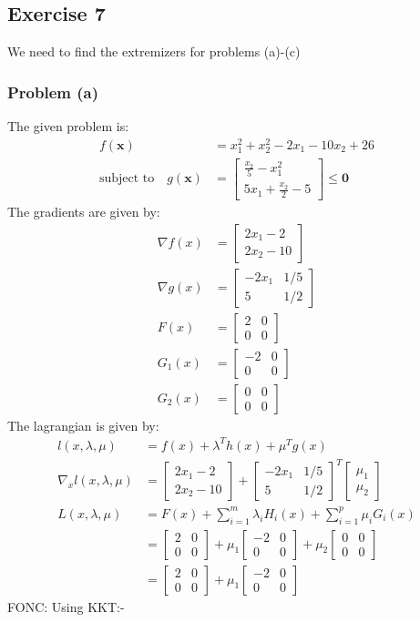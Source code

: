 \documentclass[a4paper,11pt]{article}
\newcommand{\V}[1]{\pmb{#1}}
\newcommand{\mat}[1]{\begin{bmatrix}#1\end{bmatrix}}
\begin{document}
\clearpage
\vspace{2ex}
\subsection*{Exercise 7}
We need to find the extremizers for problems (a)-(c)
\subsubsection*{Problem (a)}
The given problem is:
\begin{align*}
 f(\V{x}) &= x_1^2 + x_2^2 -2x_1 -10x_2 +26\\
 \text{subject to}\quad g(\V{x})&= \mat{\frac{x_2}{5}-x_1^2\\ 5x_1 +\frac{x_2}{2}-5} \leq \V{0}
\end{align*}
The gradients are given by:
\begin{align*}
 \nabla f(x) &= \mat{2x_1 -2\\ 2x_2-10}\\
 \nabla g(x) &= \mat{-2x_1 & 1/5\\ 5&  1/2}\\
 F(x) &= \mat{2&0\\0&0}\\
 G_1(x) &= \mat{-2 & 0\\ 0& 0}\\
 G_2(x) &= \mat{0 & 0\\ 0 &0}
\end{align*}
The lagrangian is given by:
\begin{align*}
 l(x,\lambda,\mu) &= f(x) + \lambda^Th(x) + \mu^Tg(x)\\
 \nabla_x l(x,\lambda,\mu) &= \mat{2x_1 -2\\ 2x_2-10} +
 \mat{-2x_1 & 1/5\\ 5& 1/2}^T\mat{\mu_1\\ \mu_2}\\
 L(x,\lambda,\mu)&= F(x) + \sum_{i=1}^{m}\lambda_i H_i(x) + \sum_{i=1}^{p}\mu_i G_i(x)\\
 &=  \mat{2&0\\0&0} +\mu_1\mat{-2 & 0\\ 0& 0} + \mu_2\mat{0 & 0\\ 0 &0}\\
 &= \mat{2&0\\0&0} +\mu_1\mat{-2 & 0\\ 0& 0}
\end{align*}
FONC: Using KKT:-\\
\end{document}

